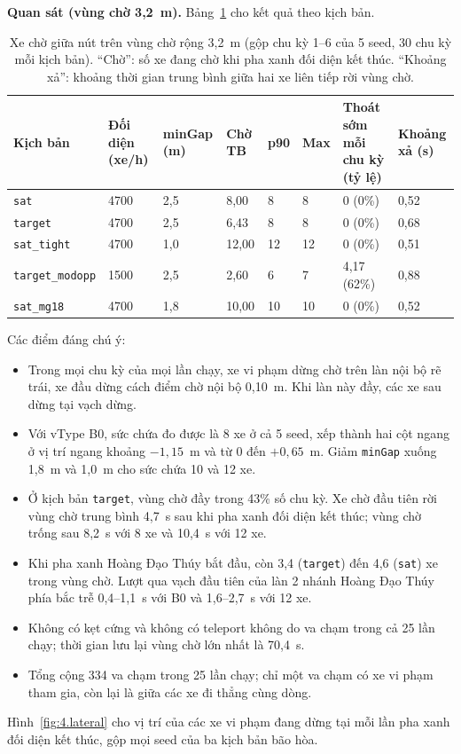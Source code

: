 \documentclass[../DoAn.tex]{subfiles}
\begin{document}
\textbf{Quan sát (vùng chờ 3,2~m).} Bảng~\ref{table:4.box} cho kết quả theo kịch bản.

\begin{table}[H]
\centering
\small\setlength{\tabcolsep}{3pt}
\caption{Xe chờ giữa nút trên vùng chờ rộng 3,2~m (gộp chu kỳ 1--6 của 5 seed, 30 chu kỳ mỗi kịch bản). ``Chờ'': số xe đang chờ khi pha xanh đối diện kết thúc. ``Khoảng xả'': khoảng thời gian trung bình giữa hai xe liên tiếp rời vùng chờ.}
\label{table:4.box}
\begin{tabular}{|p{2.3cm}|p{1.5cm}|p{1.3cm}|p{1.2cm}|p{0.9cm}|p{0.9cm}|p{2.4cm}|p{1.6cm}|}
\hline
\textbf{Kịch bản} & \textbf{Đối diện (xe/h)} & \textbf{minGap (m)} & \textbf{Chờ TB} & \textbf{p90} & \textbf{Max} & \textbf{Thoát sớm mỗi chu kỳ (tỷ lệ)} & \textbf{Khoảng xả (s)} \\ \hline
\texttt{sat} & 4700 & 2,5 & 8,00 & 8 & 8 & 0 (0\%) & 0,52 \\ \hline
\texttt{target} & 4700 & 2,5 & 6,43 & 8 & 8 & 0 (0\%) & 0,68 \\ \hline
\texttt{sat\_tight} & 4700 & 1,0 & 12,00 & 12 & 12 & 0 (0\%) & 0,51 \\ \hline
\texttt{target\_\allowbreak modopp} & 1500 & 2,5 & 2,60 & 6 & 7 & 4,17 (62\%) & 0,88 \\ \hline
\texttt{sat\_mg18} & 4700 & 1,8 & 10,00 & 10 & 10 & 0 (0\%) & 0,52 \\ \hline
\end{tabular}
\end{table}

Các điểm đáng chú ý:
\begin{itemize}
    \item Trong mọi chu kỳ của mọi lần chạy, xe vi phạm dừng chờ trên làn nội bộ rẽ trái, xe đầu dừng cách điểm chờ nội bộ 0,10~m. Khi làn này đầy, các xe sau dừng tại vạch dừng.
    \item Với vType B0, sức chứa đo được là 8 xe ở cả 5 seed, xếp thành hai cột ngang ở vị trí ngang khoảng $-1{,}15$~m và từ 0 đến $+0{,}65$~m. Giảm \texttt{minGap} xuống 1,8~m và 1,0~m cho sức chứa 10 và 12 xe.
    \item Ở kịch bản \texttt{target}, vùng chờ đầy trong 43\% số chu kỳ. Xe chờ đầu tiên rời vùng chờ trung bình 4,7~s sau khi pha xanh đối diện kết thúc; vùng chờ trống sau 8,2~s với 8 xe và 10,4~s với 12 xe.
    \item Khi pha xanh Hoàng Đạo Thúy bắt đầu, còn 3,4 (\texttt{target}) đến 4,6 (\texttt{sat}) xe trong vùng chờ. Lượt qua vạch đầu tiên của làn 2 nhánh Hoàng Đạo Thúy phía bắc trễ 0,4--1,1~s với B0 và 1,6--2,7~s với 12 xe.
    \item Không có kẹt cứng và không có teleport không do va chạm trong cả 25 lần chạy; thời gian lưu lại vùng chờ lớn nhất là 70,4~s.
    \item Tổng cộng 334 va chạm trong 25 lần chạy; chỉ một va chạm có xe vi phạm tham gia, còn lại là giữa các xe đi thẳng cùng dòng.
\end{itemize}
Hình~\ref{fig:4.lateral} cho vị trí của các xe vi phạm đang dừng tại mỗi lần pha xanh đối diện kết thúc, gộp mọi seed của ba kịch bản bão hòa.
\end{document}

